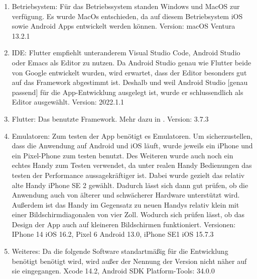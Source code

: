 \begin{enumerate}
	\item Betriebsystem: Für das Betriebssystem standen Windows und MacOS zur verfügung. Es wurde MacOs entschieden, da auf diesem Betriebsystem iOS sowie Android Apps entwickelt werden können. Version: macOS Ventura 13.2.1
	\item IDE: Flutter empfiehlt unteranderem Visual Studio Code, Android Studio oder Emacs als Editor zu nutzen\cite{tech_ideSuggestion}. Da Android Studio genau wie Flutter beide von Google entwickelt wurden, wird erwartet, dass der Editor besonders gut auf das Framework abgestimmt ist. Deshalb und weil Android Studio [genau passend] für die App-Entwicklung ausgelegt ist, wurde er schlussendlich als Editor ausgewählt. Version: 2022.1.1
	\item Flutter: Das benutzte Framework. Mehr dazu in . Version: 3.7.3
	\item Emulatoren:%
		Zum testen der App benötigt es Emulatoren. Um sicherzustellen, dass die Anwendung auf Android und iOS läuft, wurde jeweils ein iPhone und ein Pixel-Phone zum testen benutzt. 
		Des Weiteren wurde auch noch ein echtes Handy zum Testen verwendet, da unter realen Handy Bedienungen das testen der Performance aussagekräftiger ist. Dabei wurde gezielt das relativ alte Handy iPhone SE 2 gewählt. 
			Dadurch lässt sich dann gut prüfen, ob die Anwendung auch von älterer und schwächerer Hardware unterstützt wird. 
			Außerdem ist das Handy im Gegensatz zu neuen Handys relativ klein mit einer Bildschirmdiagonalen von vier Zoll. Wodurch sich prüfen lässt, ob das Design der App auch auf kleineren Bildschirmen funktioniert. 
		Versionen: IPhone 14 iOS 16.2, Pixel 6 Android 13.0, iPhone SE1 iOS 15.7.3
	\item Weiteres: Da die folgende Software standartmäßig für die Entwicklung benötigt benötigt wird, wird außer der Nennung der Version nicht näher auf sie eingegangen. Xcode 14.2, Android SDK Platform-Tools: 34.0.0
\end{enumerate}


